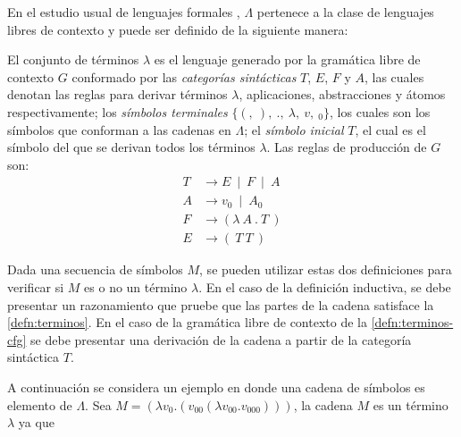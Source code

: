 En el estudio usual de lenguajes formales \cite{Hopcroft:Automata}, $ Λ $ pertenece a la clase de lenguajes libres de contexto y puede ser definido de la siguiente manera:

\begin{defn}[Términos $ λ $]
  \label{defn:terminos-cfg}
  El conjunto de términos $ λ $ es el lenguaje generado por la gramática libre de contexto $ G $ conformado por las \emph{categorías sintácticas} $ T $, $ E $, $ F $ y $ A $, las cuales denotan las reglas para derivar términos $ λ $, aplicaciones, abstracciones y átomos respectivamente; los \emph{símbolos terminales} $ \{(,\ ),\ .,\ λ,\ v,\ {}_{0}\} $, los cuales son los símbolos que conforman a las cadenas en $ Λ $; el \emph{símbolo inicial} $ T $, el cual es el símbolo del que se derivan todos los términos $ λ $. Las reglas de producción de $ G $ son:
  \begin{subequations}
  \begin{align}
    \label{terminos-cfg:terminos}
    T & \rightarrow E\ \mid\ F\ \mid\ A \\
    \label{terminos-cfg:atomos}
    A & \rightarrow v_{0}\ \mid\ A {}_{0} \\
    \label{terminos-cfg:abstracciones}
    F & \rightarrow ( λ\ A\ .\ T\ ) \\
    \label{terminos-cfg:aplicaciones}
    E & \rightarrow (\ T\ T\ )
    \end{align}
  \end{subequations}
\end{defn}

Dada una secuencia de símbolos $ M $, se pueden utilizar estas dos definiciones para verificar si $ M $ es o no un término $ λ $. En el caso de la definición inductiva, se debe presentar un razonamiento que pruebe que las partes de la cadena satisface la \autoref{defn:terminos}. En el caso de la gramática libre de contexto de la \autoref{defn:terminos-cfg} se debe presentar una derivación de la cadena a partir de la categoría sintáctica $ T $.

A continuación se considera un ejemplo en donde una cadena de símbolos es elemento de $ Λ $. Sea $ M = (λv_{0}.(v_{00} (λv_{00}.v_{000}))) $, la cadena $ M $ es un término $ λ $ ya que

